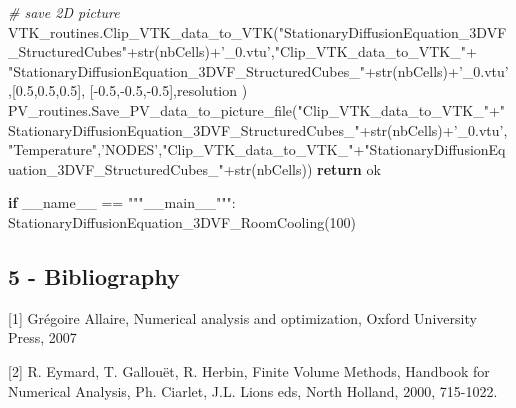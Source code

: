 \documentclass[11pt]{article}
\newenvironment{Shaded}{}{}
\newcommand{\DecValTok}[1]{\textcolor[rgb]{0.25,0.63,0.44}{{#1}}}
\newcommand{\FloatTok}[1]{\textcolor[rgb]{0.25,0.63,0.44}{{#1}}}
\newcommand{\StringTok}[1]{\textcolor[rgb]{0.25,0.44,0.63}{{#1}}}
\newcommand{\CommentTok}[1]{\textcolor[rgb]{0.38,0.63,0.69}{\textit{{#1}}}}
\newcommand{\NormalTok}[1]{{#1}}
\newcommand{\VariableTok}[1]{\textcolor[rgb]{0.10,0.09,0.49}{{#1}}}
\newcommand{\ControlFlowTok}[1]{\textcolor[rgb]{0.00,0.44,0.13}{\textbf{{#1}}}}
\newcommand{\OperatorTok}[1]{\textcolor[rgb]{0.40,0.40,0.40}{{#1}}}
\newcommand{\BuiltInTok}[1]{{#1}}
\begin{document}
\begin{Shaded}
\begin{Highlighting}[]
    \CommentTok{# save 2D picture}
\NormalTok{    VTK_routines.Clip_VTK_data_to_VTK(}\StringTok{"StationaryDiffusionEquation_3DVF_StructuredCubes"}\OperatorTok{+}\BuiltInTok{str}\NormalTok{(nbCells)}\OperatorTok{+}\StringTok{'_0.vtu'}\NormalTok{,}\StringTok{"Clip_VTK_data_to_VTK_"}\OperatorTok{+} \StringTok{"StationaryDiffusionEquation_3DVF_StructuredCubes_"}\OperatorTok{+}\BuiltInTok{str}\NormalTok{(nbCells)}\OperatorTok{+}\StringTok{'_0.vtu'}\NormalTok{,[}\FloatTok{0.5}\NormalTok{,}\FloatTok{0.5}\NormalTok{,}\FloatTok{0.5}\NormalTok{], [}\OperatorTok{-}\FloatTok{0.5}\NormalTok{,}\OperatorTok{-}\FloatTok{0.5}\NormalTok{,}\OperatorTok{-}\FloatTok{0.5}\NormalTok{],resolution )}
\NormalTok{    PV_routines.Save_PV_data_to_picture_file(}\StringTok{"Clip_VTK_data_to_VTK_"}\OperatorTok{+}\StringTok{"StationaryDiffusionEquation_3DVF_StructuredCubes_"}\OperatorTok{+}\BuiltInTok{str}\NormalTok{(nbCells)}\OperatorTok{+}\StringTok{'_0.vtu'}\NormalTok{,}\StringTok{"Temperature"}\NormalTok{,}\StringTok{'NODES'}\NormalTok{,}\StringTok{"Clip_VTK_data_to_VTK_"}\OperatorTok{+}\StringTok{"StationaryDiffusionEquation_3DVF_StructuredCubes_"}\OperatorTok{+}\BuiltInTok{str}\NormalTok{(nbCells))}
    \ControlFlowTok{return}\NormalTok{ ok}

\ControlFlowTok{if} \VariableTok{__name__} \OperatorTok{==} \StringTok{"""__main__"""}\NormalTok{:}
\NormalTok{    StationaryDiffusionEquation_3DVF_RoomCooling(}\DecValTok{100}\NormalTok{)}
    
    
\end{Highlighting}
\end{Shaded}

    \hypertarget{bibliography}{%
\subsection{5 - Bibliography}\label{bibliography}}

{[}1{]} Grégoire Allaire, Numerical analysis and optimization, Oxford
University Press, 2007

{[}2{]} R. Eymard, T. Gallouët, R. Herbin, Finite Volume Methods,
Handbook for Numerical Analysis, Ph. Ciarlet, J.L. Lions eds, North
Holland, 2000, 715-1022.


    
    
    
    
\end{document}
